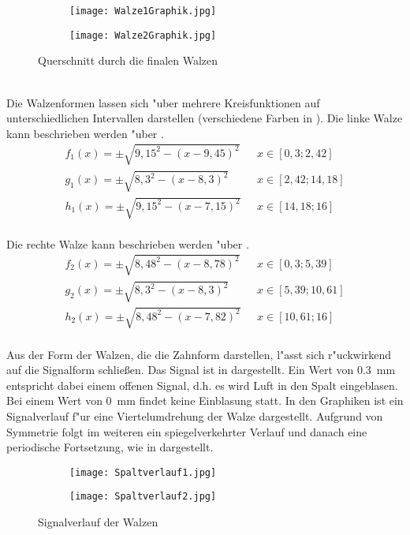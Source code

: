 \begin{figure}[h]
	\centering
	\begin{subfigure}[c]{0.4\textwidth}		
		\texttt{[image: Walze1Graphik.jpg]}
	\end{subfigure}
	\begin{subfigure}[c]{0.4\textwidth}
		\texttt{[image: Walze2Graphik.jpg]}
	\end{subfigure}
	\caption{Querschnitt durch die finalen Walzen}
	\label{fig:finalesdesign}
\end{figure}\\

Die Walzenformen lassen sich "uber mehrere Kreisfunktionen auf unterschiedlichen Intervallen darstellen (verschiedene Farben in ). Die linke Walze kann beschrieben werden "uber .
\begin{align}
	{f_1(x)}=\pm\sqrt{9,15^{2}-(x-9,45)^{2}}\,\,\,\,&x\in[0,3; 2,42] \label{eq:Walze1}\\
	{g_1(x)}=\pm\sqrt{8,3^{2}-(x-8,3)^{2}}\,\,\,\,&x\in[2,42; 14,18] \nonumber\\
	{h_1(x)}=\pm\sqrt{9,15^{2}-(x-7,15)^{2}}\,\,\,\,&x\in[14,18; 16] \nonumber
\end{align}\\
Die rechte Walze kann beschrieben werden "uber .
\begin{align}
	{f_2(x)}=\pm\sqrt{8,48^{2}-(x-8,78)^{2}}\,\,\,\,&x\in[0,3; 5,39] \label{eq:Walze2}\\
	{g_2(x)}=\pm\sqrt{8,3^{2}-(x-8,3)^{2}}\,\,\,\,&x\in[5,39; 10,61] \nonumber\\
	{h_2(x)}=\pm\sqrt{8,48^{2}-(x-7,82)^{2}}\,\,\,\,&x\in[10,61; 16] \nonumber
\end{align}\\
Aus der Form der Walzen, die die Zahnform darstellen, l"asst sich r"uckwirkend auf die Signalform schlie\ss{}en. Das Signal ist in  dargestellt. Ein Wert von \SI{0,3}{\milli\meter} entspricht dabei einem offenen Signal, d.h. es wird Luft in den Spalt eingeblasen. Bei einem Wert von \SI{0}{\milli\meter} findet keine Einblasung statt. In den Graphiken ist ein Signalverlauf f"ur eine Viertelumdrehung der Walze dargestellt. Aufgrund von Symmetrie folgt im weiteren ein spiegelverkehrter Verlauf und danach eine periodische Fortsetzung, wie in  dargestellt.
\begin{figure}[h]
	\centering
	\begin{subfigure}[c]{0.7\textwidth}		
		\texttt{[image: Spaltverlauf1.jpg]}
	\end{subfigure}
	\begin{subfigure}[c]{0.7\textwidth}
		\texttt{[image: Spaltverlauf2.jpg]}
	\end{subfigure}
	\caption{Signalverlauf der Walzen}
	\label{fig:spaltverlauf}
\end{figure}

